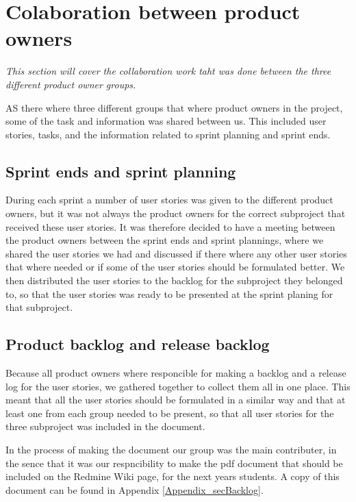 \section{Colaboration between product owners}
\textit{This section will cover the collaboration work taht was done between the three different product owner groups.}

AS there where three different groups that where product owners in the project, some of the task and information was shared between us. This included user stories, tasks, and the information related to sprint planning and sprint ends.

\subsection{Sprint ends and sprint planning}
During each sprint a number of user stories was given to the different product owners, but it was not always the product owners for the correct subproject that received these user stories. It was therefore decided  to have a meeting between the product owners between the sprint ends and sprint plannings, where we shared the user stories we had and discussed if there where any other user stories that where needed or if some of the user stories should be formulated better. We then distributed the user stories to the backlog for the subproject they belonged to, so that the user stories was ready to be presented at the sprint planing for that subproject.

\subsection{Product backlog and release backlog}
Because all product owners where responcible for making a backlog and a release log for the user stories, we gathered together to collect them all in one place. This meant that all the user stories should be formulated in a similar way and that at least one from each group needed to be present, so that all user stories for the three subproject was included in the document.

In the process of making the document our group was the main contributer, in the sence that it was our respncibility to make the pdf document that should be included on the Redmine Wiki page, for the next years students. A copy of this document can be found in Appendix \ref{Appendix_secBacklog}.